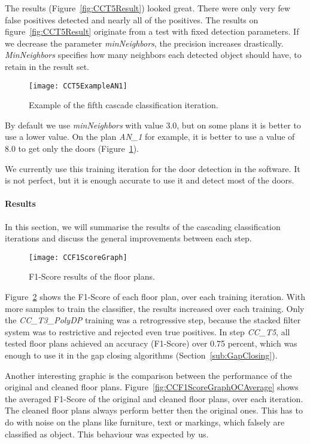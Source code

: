 The results (Figure~\ref{fig:CCT5Result}) looked great. There were only very few false positives detected and nearly all of the positives. The results on figure~\ref{fig:CCT5Result} originate from a test with fixed detection parameters. If we decrease the parameter \textit{minNeighbors}, the precision increases drastically. \textit{MinNeighbors} specifies how many neighbors each detected object should have, to retain in the result set.

\begin{figure}[H]
	\centering
	\texttt{[image: CCT5ExampleAN1]}
	\caption{Example of the fifth cascade classification iteration.}
	\label{fig:CCT5ExampleAN1}
\end{figure}

By default we use \textit{minNeighbors} with value $3.0$, but on some plans it is better to use a lower value. On the plan \textit{AN\_1} for example, it is better to use a value of 8.0 to get only the doors (Figure~\ref{fig:CCT5ExampleAN1}).

We currently use this training iteration for the door detection in the software. It is not perfect, but it is enough accurate to use it and detect most of the doors.

\paragraph{Results}
In this section, we will summarise the results of the cascading classification iterations and discuss the general improvements between each step.

\begin{figure}[H]
	\centering
	\texttt{[image: CCF1ScoreGraph]}
	\caption{F1-Score results of the floor plans.}
	\label{fig:CCF1ScoreGraph}
\end{figure}

Figure~\ref{fig:CCF1ScoreGraph} shows the F1-Score of each floor plan, over each training iteration. With more samples to train the classifier, the results increased over each training. Only the \textit{CC\_T3\_PolyDP} training was a retrogressive step, because the stacked filter system was to restrictive and rejected even true positives. In step \textit{CC\_T5}, all tested floor plans achieved an accuracy (F1-Score) over 0.75 percent, which was enough to use it in the gap closing algorithms (Section~\ref{sub:GapClosing}).

Another interesting graphic is the comparison between the performance of the original and cleaned floor plans. Figure~\ref{fig:CCF1ScoreGraphOCAverage} shows the averaged F1-Score of the original and cleaned floor plans, over each iteration. The cleaned floor plans always perform better then the original ones. This has to do with noise on the plans like furniture, text or markings, which falsely are classified as object. This behaviour was expected by us.

